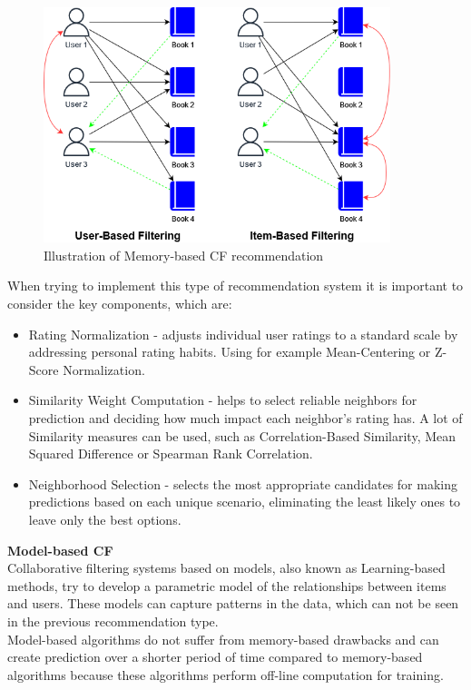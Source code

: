 \documentclass[\myFontSize,a4paper,oneside,hidelinks]{article}
\begin{document}
\begin{figure}[h!]
    \centering
    \includegraphics[width=0.9\textwidth]{img/collaborative_example.png}
    \caption{Illustration of Memory-based CF recommendation}
    \label{fig:collaborative_example}
\end{figure}
%
%
When trying to implement this type of recommendation system it is important to consider the key components, which are: 
\begin{itemize}
\item Rating Normalization - adjusts individual user ratings to a standard scale by addressing personal rating habits. Using for example Mean-Centering or Z-Score Normalization. 
\item Similarity Weight Computation - helps to select reliable neighbors for prediction and deciding how much impact each neighbor's rating has. A lot of Similarity measures can be used, such as Correlation-Based Similarity, Mean Squared Difference or Spearman Rank Correlation. 
\item Neighborhood Selection - selects the most appropriate candidates for making predictions based on each unique scenario, eliminating the least likely ones to leave only the best options. \cite{Ning201537}\\
\end{itemize}
%
%
\textbf{Model-based CF}\\
Collaborative filtering systems based on models, also known as Learning-based methods, try to develop a parametric model of the relationships between items and users. These models can capture patterns in the data, which can not be seen in the previous recommendation type. \\
Model-based algorithms do not suffer from memory-based drawbacks and can create prediction over a shorter period of time compared to memory-based algorithms because these algorithms perform off-line computation for training. 
\end{document}
